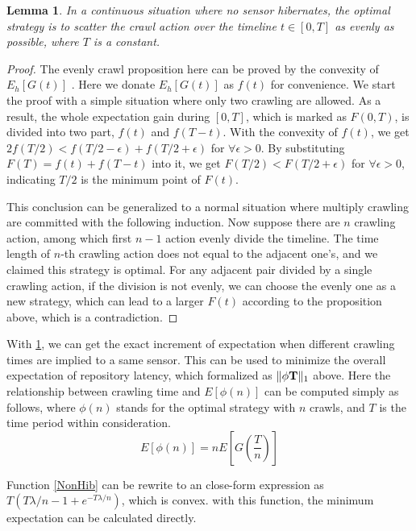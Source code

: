 \documentclass[conference]{IEEEtran}
\newtheorem{lemma}{Lemma}
\begin{document}
\begin{lemma}
\label{evenly}
In a continuous situation where no sensor hibernates, the optimal strategy is to scatter the crawl action over the timeline $t\in [0, T]$ as evenly as possible, where $T$ is a constant.
\end{lemma}

\begin{proof}
The evenly crawl proposition here can be proved by the convexity of $E_h[G(t)]$ \cite{boyd2004convex}. Here we donate $E_h[G(t)]$ as $f(t)$ for convenience. 
We start the proof with a simple situation where only two crawling are allowed. 
As a result, the whole expectation gain during $[0,T]$, which is marked as $F(0, T)$, is divided into two part, $f(t)$ and $f(T-t)$. With the convexity of $f(t)$, we get $2f(T/2)<f(T/2-\epsilon)+f(T/2+\epsilon)$ for $\forall{\epsilon>0}$. By substituting $F(T)=f(t)+f(T-t)$ into it, we get $F(T/2)<F(T/2+\epsilon)$ for $\forall{\epsilon>0}$, indicating $T/2$ is the minimum point of $F(t)$.


This conclusion can be generalized to a normal situation where multiply crawling are committed with the following induction. 
Now suppose there are $n$ crawling action, among which first $n-1$ action evenly divide the timeline. The time length of $n$-th crawling action does not equal to the adjacent one's, and we claimed this strategy is optimal. For any adjacent pair divided by a single crawling action, if the division is not evenly, we can choose the evenly one as a new strategy, which can lead to a larger $F(t)$ according to the proposition above, which is a contradiction.
\end{proof}


With \ref{evenly}, we can get the exact increment of expectation when different crawling times are implied to a same sensor. This can be used to minimize the overall expectation of repository latency, which formalized as $\Arrowvert \phi\mathbf{T} \Arrowvert_{1}$ above.
Here the relationship between crawling time and $E[\phi(n)]$ can be computed simply as follows, where $\phi(n)$ stands for the optimal strategy with $n$ crawls, and $T$ is the time period within consideration. 
\begin{equation}
E[\phi(n)]=nE[G(\frac{T}{n})]\label{NonHib}
\end{equation}


Function \eqref{NonHib} can be rewrite to an close-form expression as $T(T\lambda/n-1+e^{-T\lambda/n})$, which is convex. with this function, the minimum expectation can be calculated directly.
\end{document}
